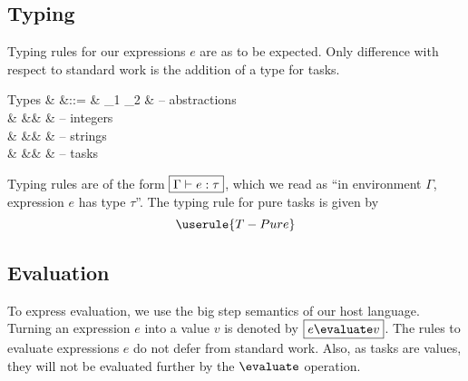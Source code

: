 \subsection{Typing}

Typing rules for our expressions $e$ are as to be expected.
Only difference with respect to standard work is the addition of a type for tasks.
\begin{grammar}
  Types
    & \tau &::= & \tau_1 \to \tau_2 & – abstractions \\
    &      &\mid& \Int              & – integers \\
    &      &\mid& \String           & – strings \\
    &      &\mid& \Task \tau        & – tasks \\
\end{grammar}
Typing rules are of the form $\boxed{\Gamma \vdash e : \tau}$,
which we read as \enquote{in environment $\Gamma$, expression $e$ has type $\tau$}.
The typing rule for pure tasks is given by
\begin{equation*}
  \userule{T-Pure}
\end{equation*}


\subsection{Evaluation}

To express evaluation,
we use the big step semantics of our host language.
Turning an expression $e$ into a value $v$ is denoted by $\boxed{e \evaluate v}$.
The rules to evaluate expressions $e$ do not defer from standard work.
Also, as tasks are values, they will not be evaluated further by the $\evaluate$ operation.
